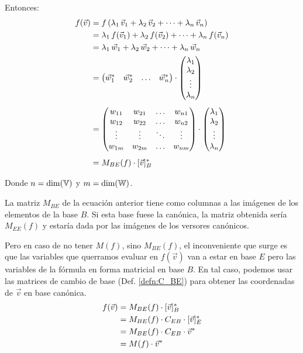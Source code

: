 \documentclass[a5paper,12pt,twoside]{book}
\begin{document}
Entonces:
\begin{align*}
    f(\Vec{v}) &= f \left( \lambda_1 \, \Vec{v}_1 + \lambda_2 \, \Vec{v}_2 + \dots + \lambda_n \, \Vec{v}_n \right)
    \\
    &= \lambda_1 \, f(\Vec{v}_1) + \lambda_2 \, f(\Vec{v}_2) + \dots + \lambda_n \, f(\Vec{v}_n)
    \\
    &= \lambda_1 \, \Vec{w}_1 + \lambda_2 \, \Vec{w}_2 + \dots + \lambda_n \, \Vec{w}_n
    \\
    &=
    \begin{pmatrix}
        \Vec{w}_1^* & \Vec{w}_2^* & \dots & \Vec{w}_n^*
    \end{pmatrix}
    \cdot
    \begin{pmatrix}
        \lambda_1
        \\
        \lambda_2
        \\
        \vdots
        \\
        \lambda_n
    \end{pmatrix}
    \\[1ex]
    &=
    \begin{pmatrix}
        w_{11} & w_{21} & \dots & w_{n 1}
        \\
        w_{12} & w_{22} & \dots & w_{n 2}
        \\
        \vdots & \vdots & \ddots & \vdots
        \\
        w_{1 m} & w_{2 m} & \dots & w_{n m}
    \end{pmatrix}
    \cdot
    \begin{pmatrix}
        \lambda_1
        \\
        \lambda_2
        \\
        \vdots
        \\
        \lambda_n
    \end{pmatrix}
    \\[1ex]
    &= M_{BE} (f) \cdot [\Vec{v}]_B^*
\end{align*}

Donde $n=\operatorname{dim}(\mathbb{V})$ y $m=\operatorname{dim}(\mathbb{W})$.

La matriz $M_{BE}$ de la ecuación anterior tiene como columnas a las imágenes de los elementos de la base $B$.
Si esta base fuese la canónica, la matriz obtenida sería $M_{EE}(f)$ y estaría dada por las imágenes de los versores canónicos.

Pero en caso de no tener $M(f)$, sino $M_{BE}(f)$, el inconveniente que surge es que las variables que querramos evaluar en $f(\Vec{v})$ van a estar en base $E$ pero las variables de la fórmula en forma matricial en base $B$.
En tal caso, podemos usar las matrices de cambio de base (Def. \ref{defn:C_BE}) para obtener las coordenadas de $\Vec{v}$ en base canónica.
\begin{align*}
    f(\Vec{v}) &= M_{BE} (f) \cdot [\Vec{v}]_B^*
    \\
    &= M_{BE} (f) \cdot C_{EB} \cdot [\Vec{v}]_E^*
    \\
    &= M_{BE} (f) \cdot C_{EB} \cdot \Vec{v}^*
    \\
    &= M(f) \cdot \Vec{v}^*
\end{align*}
\end{document}
